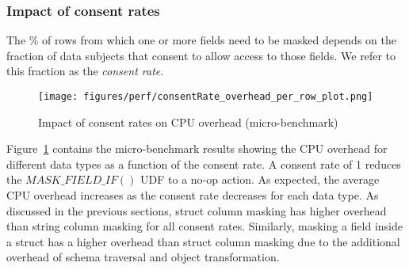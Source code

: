 \subsubsection{Impact of consent rates} 
The  \% of rows from which one or more fields need to be masked depends on the fraction of data subjects that consent to allow access to those fields.  
We refer to this fraction as the {\em consent rate}. 
\begin{figure}[ht]  %
    \vspace{-1em}
    \texttt{[image: figures/perf/consentRate\_overhead\_per\_row\_plot.png]}
    \vspace{-1em}
    \caption{Impact of consent rates on CPU overhead (micro-benchmark)}  %
    \vspace{-1em}
    \label{fig:PerfVaryingRedactionRate}  %
\end{figure}
Figure~\ref{fig:PerfVaryingRedactionRate} contains the micro-benchmark results showing the CPU overhead for different data types as a function of the
consent rate. A consent rate of 1 reduces the $MASK\_FIELD\_IF()$ UDF to a no-op action. As expected, the average CPU overhead increases
as the consent rate decreases for each data type. As discussed in the previous sections, struct column masking has
higher overhead than string column masking for all consent rates. Similarly, masking a field inside a struct has a higher overhead
than struct column masking due to the additional overhead of schema traversal and object transformation. \\

